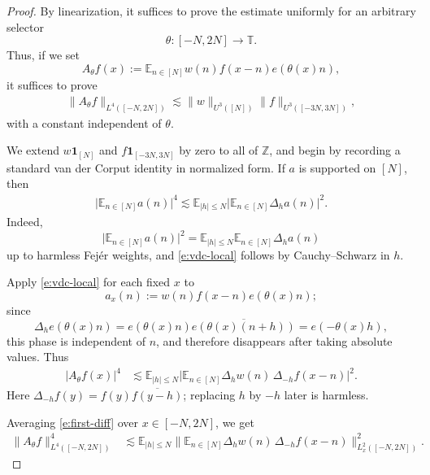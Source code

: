 \documentclass[12pt]{amsart}
\numberwithin{equation}{section}
\theoremstyle{definition}
\begin{document}
\begin{proof}
By linearization, it suffices to prove the estimate uniformly for an arbitrary selector
\[
    \theta:[-N,2N]\to\mathbb T.
\]
Thus, if we set
\[
    A_\theta f(x)
    :=
    \mathbb E_{n\in[N]} w(n)f(x-n)e(\theta(x)n),
\]
it suffices to prove
\begin{align}\label{e:U3lin-target}
    \|A_\theta f\|_{L^4([-N,2N])}
    \lesssim
    \|w\|_{U^3([N])}
    \|f\|_{U^3([-3N,3N])},
\end{align}
with a constant independent of \(\theta\).

We extend \(w\mathbf 1_{[N]}\) and \(f\mathbf 1_{[-3N,3N]}\) by zero to all of
\(\mathbb Z\), and begin by recording a standard van der Corput identity in normalized form. If \(a\) is
supported on $[N]$, then
\begin{align}\label{e:vdc-local}
    \big|
    \mathbb E_{n \in [N]} a(n)
    \big|^4
    \lesssim
    \mathbb E_{|h|\leq N}
    \big|
    \mathbb E_{n \in [N]} \Delta_h a(n)
    \big|^2.
\end{align}
Indeed,
\[
    \big|\mathbb E_{n \in [N]} a(n)\big|^2
    =
    \mathbb E_{|h|\leq N}
    \mathbb E_{n \in [N]} \Delta_h a(n)
\]
up to harmless Fej\'{e}r weights, and \eqref{e:vdc-local} follows by Cauchy--Schwarz in
\(h\).

Apply \eqref{e:vdc-local} for each fixed \(x\) to
\[
    a_x(n):=w(n)f(x-n)e(\theta(x)n);
\]
since
\[
    \Delta_h e(\theta(x)n)
    =
    e(\theta(x)n)\overline{e(\theta(x)(n+h))}
    =
    e(-\theta(x)h),
\]
this phase is independent of \(n\), and therefore disappears after taking absolute values.
Thus
\begin{align}\label{e:first-diff}
    |A_\theta f(x)|^4
    &\lesssim
    \mathbb E_{|h|\leq N}
    \big|
    \mathbb E_{n \in [N]}
    \Delta_h w(n)\,
    \Delta_{-h} f(x-n)
    \big|^2.
\end{align}
Here \(\Delta_{-h}f(y)=f(y)\overline{f(y-h)}\); replacing \(h\) by \(-h\) later is harmless.

Averaging \eqref{e:first-diff} over \(x\in[-N,2N]\), we get
\begin{align}\label{e:xh-average}
    \|A_\theta f\|_{L^4([-N,2N])}^4
    &\lesssim
    \mathbb E_{|h|\leq N}
    \Big\|
    \mathbb E_{n \in [N]}
    \Delta_h w(n)\,
    \Delta_{-h} f(x-n)
    \Big\|_{L^2_x([-N,2N])}^2.
\end{align}


\end{proof}
\end{document}
